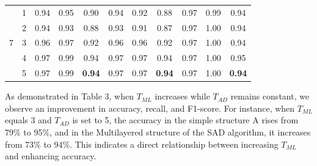 \documentclass[12pt]{article}
\begin{document}
\begin{table}[H]
\begin{tabular}{rrrrrrrrrrr}
            \hline
            \multicolumn{1}{c}{\multirow{5}{*}{7}} & \multicolumn{1}{c}{1}& 0.94 & 0.95 & \multicolumn{1}{c}{0.90} & 0.94 & 0.92 & \multicolumn{1}{c}{0.88} & 0.97 & 0.99 & \multicolumn{1}{c}{0.94}  \\
            \multicolumn{1}{c}{} & \multicolumn{1}{c}{2}& 0.94 & 0.93 & \multicolumn{1}{c}{0.88} & 0.93 & 0.91 & \multicolumn{1}{c}{0.87} & 0.97 & 1.00 & \multicolumn{1}{c}{0.94}  \\
            \multicolumn{1}{c}{} & \multicolumn{1}{c}{3}& 0.96 & 0.97 & \multicolumn{1}{c}{0.92} & 0.96 & 0.96 & \multicolumn{1}{c}{0.92} & 0.97 & 1.00 & \multicolumn{1}{c}{0.94}  \\
            \multicolumn{1}{c}{} & \multicolumn{1}{c}{4}& 0.97 & 0.99 & \multicolumn{1}{c}{0.94} & 0.97 & 0.97 & \multicolumn{1}{c}{0.94} & 0.97 & 1.00 & \multicolumn{1}{c}{0.95}   \\
            \multicolumn{1}{c}{} & \multicolumn{1}{c}{5}& 0.97 & 0.99 & \multicolumn{1}{c}{\textbf{0.94}} & 0.97 & 0.97 & \multicolumn{1}{c}{\textbf{0.94}} & 0.97 & 1.00 & \multicolumn{1}{c}{\textbf{0.94}} \\
            \hline
        \end{tabular}
    \end{table}
As demonstrated in Table 3, when $T_{ML}$ increases while $T_{AD}$
remains constant, we observe an improvement in accuracy, recall,
and F1-score. For instance, when $T_{ML}$ equals 3 and $T_{AD}$ is
set to 5, the accuracy in the simple structure A rises from 79\%
to 95\%, and in the Multilayered structure of the SAD algorithm, it increases from 73\%
to 94\%. This indicates a direct relationship between increasing
$T_{ML}$ and enhancing accuracy.
\end{document}
